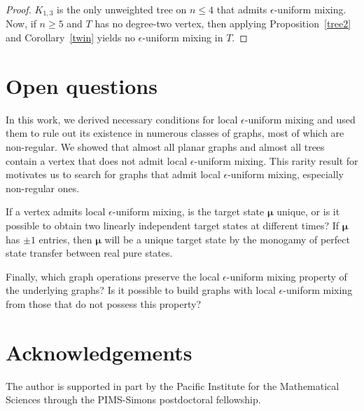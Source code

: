 \documentclass[11pt]{article}
\newcommand{\bmu}{{\boldsymbol{\mu}}}
\begin{document}
\begin{proof} 
$K_{1,3}$ is the only unweighted tree on $n\leq 4$ that admits $\epsilon$-uniform mixing. Now, if $n\geq 5$ and $T$ has no degree-two vertex, then applying Proposition~\ref{tree2} and Corollary~\ref{twin} yields no $\epsilon$-uniform mixing in $T$.
\end{proof}

\section{Open questions}
\label{sec:oq}

In this work, we derived necessary conditions for local $\epsilon$-uniform mixing and used them to rule out its existence in numerous classes of graphs, most of which are non-regular. We showed that almost all planar graphs and almost all trees  contain a vertex that does not admit local $\epsilon$-uniform mixing. This rarity result for motivates us to search for graphs that admit local $\epsilon$-uniform mixing, especially non-regular ones. 

If a vertex admits local $\epsilon$-uniform mixing, is the target state $\bmu$ unique, or is it possible to obtain two linearly independent target states at different times? If $\bmu$ has $\pm 1$ entries, then $\bmu$ will be a unique target state by the monogamy of perfect state transfer between real pure states. 

Finally, which graph operations preserve the local $\epsilon$-uniform mixing property of the underlying graphs? Is it possible to build graphs with local $\epsilon$-uniform mixing from those that do not possess this property?

\section*{Acknowledgements}
The author is supported in part by the Pacific Institute for the Mathematical Sciences through the PIMS-Simons postdoctoral fellowship.



\end{document}
